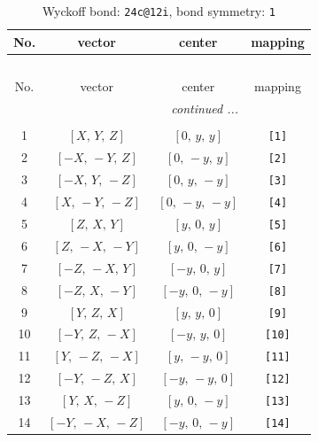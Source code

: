 \documentclass[fleqn,8pt]{jsarticle}
\begin{document}
\begin{longtable}{cccc}
\caption{Wyckoff bond: {\tt 24c@12i}, bond symmetry: {\tt 1}}
 \\
 \hline \hline
No. & vector & center & mapping \\ \hline \endfirsthead

\multicolumn{3}{l}{\tablename\ \thetable{}} \\
 \hline \hline
No. & vector & center & mapping \\ \hline \endhead

 \hline \hline
\multicolumn{3}{r}{\footnotesize\it continued ...} \\ \endfoot

 \hline \hline
\multicolumn{3}{r}{} \\ \endlastfoot

1 & $\left[ X,\, Y,\, Z \right]$ & $\left[ 0,\, y,\, y \right]$ & {\tt [1]} \\ \hline
2 & $\left[ - X,\, - Y,\, Z \right]$ & $\left[ 0,\, - y,\, y \right]$ & {\tt [2]} \\ \hline
3 & $\left[ - X,\, Y,\, - Z \right]$ & $\left[ 0,\, y,\, - y \right]$ & {\tt [3]} \\ \hline
4 & $\left[ X,\, - Y,\, - Z \right]$ & $\left[ 0,\, - y,\, - y \right]$ & {\tt [4]} \\ \hline
5 & $\left[ Z,\, X,\, Y \right]$ & $\left[ y,\, 0,\, y \right]$ & {\tt [5]} \\ \hline
6 & $\left[ Z,\, - X,\, - Y \right]$ & $\left[ y,\, 0,\, - y \right]$ & {\tt [6]} \\ \hline
7 & $\left[ - Z,\, - X,\, Y \right]$ & $\left[ - y,\, 0,\, y \right]$ & {\tt [7]} \\ \hline
8 & $\left[ - Z,\, X,\, - Y \right]$ & $\left[ - y,\, 0,\, - y \right]$ & {\tt [8]} \\ \hline
9 & $\left[ Y,\, Z,\, X \right]$ & $\left[ y,\, y,\, 0 \right]$ & {\tt [9]} \\ \hline
10 & $\left[ - Y,\, Z,\, - X \right]$ & $\left[ - y,\, y,\, 0 \right]$ & {\tt [10]} \\ \hline
11 & $\left[ Y,\, - Z,\, - X \right]$ & $\left[ y,\, - y,\, 0 \right]$ & {\tt [11]} \\ \hline
12 & $\left[ - Y,\, - Z,\, X \right]$ & $\left[ - y,\, - y,\, 0 \right]$ & {\tt [12]} \\ \hline
13 & $\left[ Y,\, X,\, - Z \right]$ & $\left[ y,\, 0,\, - y \right]$ & {\tt [13]} \\ \hline
14 & $\left[ - Y,\, - X,\, - Z \right]$ & $\left[ - y,\, 0,\, - y \right]$ & {\tt [14]} \\ \hline

\end{longtable}
\end{document}
